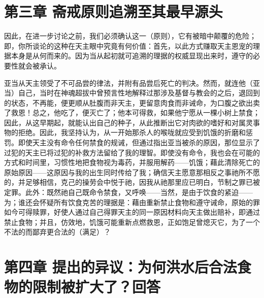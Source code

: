 
\section{第三章 斋戒原则追溯至其最早源头}

因此，在进一步讨论之前，我们必须确认这一（原则），它有被暗中颠覆的危险；即，你所谈论的这种在天主眼中究竟有何价值：首先，以此方式赚取天主恩宠的理据本身是从何而来的。因为当从起初就可追溯的理据的权威显现出来时，遵守的必要性就会被承认。\par

亚当从天主领受了不可品尝的律法，并附有品尝后死亡的判决。然而，就连他（亚当）自己，当时在神魂超拔中曾预言性地解释过那涉及基督与教会的之后，退回到的状态，不再能，便更顺从肚腹而非天主，更留意肉食而非诫命，为口腹之欲出卖了救恩！总之，他吃了，便灭亡了；他本可得救，如果他宁愿从一棵小树上禁食；因此，从这早期起，就能认出自己的种子，从此推断出它对肉欲的嗜好和对属灵事物的拒绝。因此，我坚持认为，从一开始那杀人的喉咙就应受到饥饿的折磨和惩罚。即使天主没有命令任何禁食的规诫，但通过指出亚当被杀的原因，那位显示了过犯的天主已将过犯的补救方法留给了我的理智。即使没有命令，我也会在可能的方式和时间里，习惯性地把食物视为毒药，并服用解药——饥饿；藉此清除死亡的原始原因——这原因与我的出生同时传给了我；确信天主愿意那相反之事祂所不愿的，并足够相信，克己的操劳会中悦于祂，因我从祂那里应已明白，节制之罪已被定罪。此外：既然祂自己既命令禁食，又呼唤——当然，是由于饮食的紧迫——为；谁还会怀疑所有饮食克苦的理据是：藉由重新禁止食物和遵守诫命，原始的罪如今可得赎罪，好使人通过自己得罪天主的同一原因材料向天主做出赔补，即通过禁止食物；并且，仿效地，饥饿可能重新点燃救恩，正如饱足曾熄灭它，为了一个不法的而鄙弃更合法的（满足）？\par


\section{第四章 提出的异议：为何洪水后合法食物的限制被扩大了？回答}

